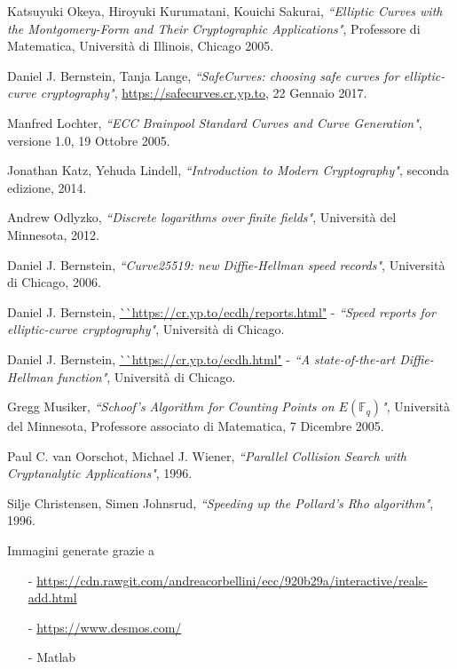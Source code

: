 \documentclass[a4paper,12pt]{tesiinfo}
\begin{document}
\begin{thebibliography}{99}
  Katsuyuki Okeya, Hiroyuki Kurumatani, Kouichi Sakurai,
  \emph{``Elliptic Curves with the Montgomery-Form
and Their Cryptographic Applications"},
Professore di Matematica,
Universit\`a di Illinois, Chicago 
  2005.
  
Daniel J. Bernstein, Tanja Lange,
\emph{``SafeCurves: choosing safe curves for elliptic-curve cryptography"},
\url{https://safecurves.cr.yp.to}, 
22 Gennaio 2017.

  Manfred Lochter,
  \emph{``ECC Brainpool Standard Curves and Curve Generation"},
versione 1.0,
19 Ottobre 2005.

  Jonathan Katz, Yehuda Lindell,
  \emph{``Introduction to Modern Cryptography"},
seconda edizione,
2014.

  Andrew Odlyzko,
  \emph{``Discrete logarithms over finite fields"},
Universit\`a del Minnesota,
2012.

  Daniel J. Bernstein,
  \emph{``Curve25519: new Diffie-Hellman speed records"},
Universit\`a di Chicago,
2006.

  Daniel J. Bernstein,
  \url{``https://cr.yp.to/ecdh/reports.html"} - \emph{``Speed reports for elliptic-curve cryptography"},
Universit\`a di Chicago.



  Daniel J. Bernstein,
  \url{``https://cr.yp.to/ecdh.html"} - \emph{``A state-of-the-art Diffie-Hellman function"},
Universit\`a di Chicago.

  Gregg Musiker,
  \emph{``Schoof's Algorithm for Counting Points on $E(\mathbb{F}_q)$"},
Universit\`a del Minnesota,
Professore associato di Matematica,
7 Dicembre 2005.

  Paul C. van Oorschot, Michael J. Wiener,
  \emph{``Parallel Collision Search with Cryptanalytic Applications"},
1996.

  Silje Christensen, Simen Johnsrud,
  \emph{``Speeding up the Pollard’s Rho algorithm"},
1996.






  Immagini generate grazie a 
  \begin{itemize}
      \item[-] \url{https://cdn.rawgit.com/andreacorbellini/ecc/920b29a/interactive/reals-add.html}
      \item[-] \url{https://www.desmos.com/}
      \item[-] Matlab
  \end{itemize}
  
  
  

\end{thebibliography}
\end{document}
